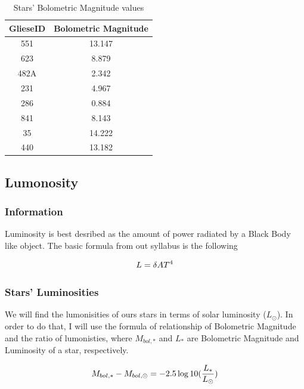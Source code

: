 \documentclass{article}
\begin{document}
\begin{table}[h]
    \begin{center}
      \caption{Stars' Bolometric Magnitude values}
      \begin{tabular}{c | c}
        \textbf{GlieseID} & \textbf{Bolometric Magnitude}\\
        \hline
        551  & 13.147\\
        623  & 8.879\\
        482A & 2.342\\
        231  & 4.967\\
        286  & 0.884\\
        841  & 8.143\\
        35   & 14.222\\
        440  & 13.182\\
      \end{tabular}
      \label{mbol}
    \end{center}
  \end{table}
    
\subsection{Lumonosity}

\subsubsection{Information}

Luminosity is best desribed as the amount of power radiated by a Black Body like object. The basic formula from out syllabus is the following

\begin{equation}
  L = \delta AT^4\\
  \end{equation}

\subsubsection{Stars' Luminosities}

We will find the lumonisities of ours stars in terms of solar luminosity ($L_{\odot}$). In order to do that, I will use the formula of relationship of Bolometric Magnitude and the ratio of lumonisties, where $M_{bol, *}$ and $L_*$ are Bolometric Magnitude and Luminosity of a star, respectively.

\begin{equation}
  M_{bol, *} - M_{bol, \odot} = -2.5 \log{10}{(\frac{L_*}{L_{\odot}})}\\
  \end{equation}
\end{document}
